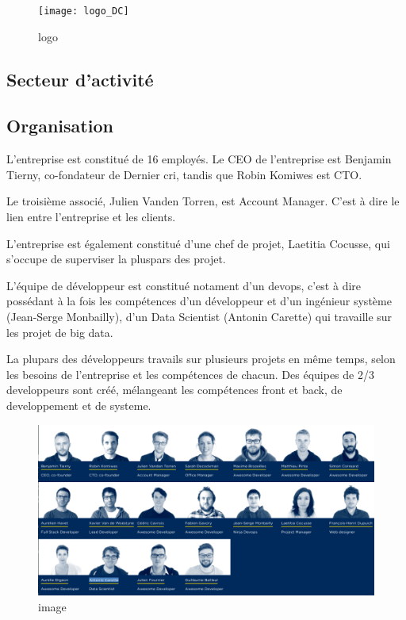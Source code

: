 \bigskip

\begin{figure}
\centering
\texttt{[image: logo\_DC]}
\caption{logo}
\end{figure}

\newpage

\subsection{Secteur d'activité}\label{secteur-dactivituxe9}

\bigskip

\subsection{Organisation}\label{organisation}

\bigskip

L'entreprise est constitué de 16 employés. Le CEO de l'entreprise est
Benjamin Tierny, co-fondateur de Dernier cri, tandis que Robin Komiwes
est CTO.

\bigskip

Le troisième associé, Julien Vanden Torren, est Account Manager. C'est à
dire le lien entre l'entreprise et les clients.

\bigskip

L'entreprise est également constitué d'une chef de projet, Laetitia
Cocusse, qui s'occupe de superviser la pluspars des projet.

\bigskip

L'équipe de développeur est constitué notament d'un devops, c'est à dire
possédant à la fois les compétences d'un développeur et d'un ingénieur
système (Jean-Serge Monbailly), d'un Data Scientist (Antonin Carette)
qui travaille sur les projet de big data.

\bigskip

La plupars des développeurs travails sur plusieurs projets en même
temps, selon les besoins de l'entreprise et les compétences de chacun.
Des équipes de 2/3 developpeurs sont créé, mélangeant les compétences
front et back, de developpement et de systeme.

\bigskip

\begin{figure}
\centering
\includegraphics{team.png}
\caption{image}
\end{figure}

